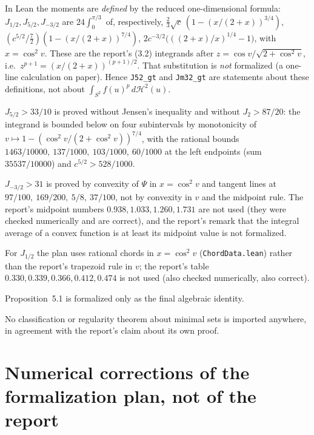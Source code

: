 \documentclass[11pt]{article}
\newcommand{\Ln}[1]{\texttt{#1}}
\begin{document}
\begin{description}\itemsep3pt
\item[D1 (scope).] In Lean the moments are \emph{defined} by the reduced one-dimensional
formula: $J_{1/2},J_{5/2},J_{-3/2}$ are $24\int_0^{\pi/3}$ of, respectively,
$\tfrac23\sqrt c\,(1-(x/(2+x))^{3/4})$,
$(c^{5/2}/\tfrac72)(1-(x/(2+x))^{7/4})$,
$2c^{-3/2}\bigl(((2+x)/x)^{1/4}-1\bigr)$, with $x=\cos^2 v$. These are the report's (3.2)
integrands after $z=\cos v/\sqrt{2+\cos^2 v}$, i.e.\ $z^{p+1}=(x/(2+x))^{(p+1)/2}$. That
substitution is \emph{not} formalized (a one-line calculation on paper). Hence \Ln{J52\_\allowbreak{}gt} and
\Ln{Jm32\_\allowbreak{}gt} are statements about these definitions, not about
$\int_{S^2}f(u)^p\,d\mathcal{H}^2(u)$.
\item[D2 (method).] $J_{5/2}>33/10$ is proved without Jensen's inequality and without
$J_2>87/20$: the integrand is bounded below on four subintervals by monotonicity of
$v\mapsto1-(\cos^2v/(2+\cos^2v))^{7/4}$, with the rational bounds
$1463/10000,\ 137/1000,\ 103/1000,\ 60/1000$ at the left endpoints (sum $35537/10000$) and
$c^{5/2}>528/1000$.
\item[D3 (method).] $J_{-3/2}>31$ is proved by convexity of $\Psi$ in $x=\cos^2v$ and tangent
lines at $97/100,\ 169/200,\ 5/8,\ 37/100$, not by convexity in $v$ and the midpoint rule. The
report's midpoint numbers $0.938,1.033,1.260,1.731$ are not used (they were checked
numerically and are correct), and the report's remark that the integral average of a convex
function is at least its midpoint value is not formalized.
\item[D4 (method).] For $J_{1/2}$ the plan uses rational chords in $x=\cos^2v$
(\Ln{ChordData.lean}) rather than the report's trapezoid rule in $v$; the report's table
$0.330,0.339,0.366,0.412,0.474$ is not used (also checked numerically, also correct).
\item[D5 (scope).] Proposition~5.1 is formalized only as the final algebraic identity.
\item[D6 (no imports).] No classification or regularity theorem about minimal sets is imported
anywhere, in agreement with the report's claim about its own proof.
\end{description}

\section{Numerical corrections of the formalization plan, not of the report}
\label{sec:corrections}
\end{document}
